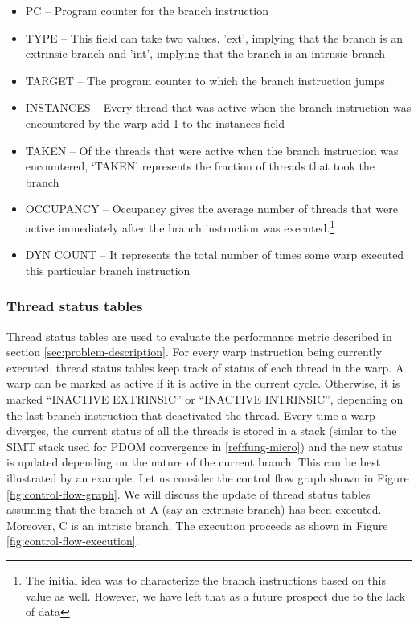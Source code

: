 \begin{itemize}
	\item PC -- Program counter for the branch instruction
	\item TYPE -- This field can take two values. 'ext', implying that the branch is an extrinsic branch and 'int', implying that the branch is an intrnsic branch 
	\item TARGET -- The program counter to which the branch instruction jumps
	\item INSTANCES -- Every thread that was active when the branch instruction was encountered by the warp add 1 to the instances field
	\item TAKEN -- Of the threads that were active when the branch instruction was encountered, `TAKEN' represents the fraction of threads that took the branch
	\item OCCUPANCY -- Occupancy gives the average number of threads that were active immediately after the branch instruction was executed.\footnote{The initial idea was to characterize the branch instructions based on this value as well. However, we have left that as a future prospect due to the lack of data}
	\item DYN COUNT -- It represents the total number of times some warp executed this particular branch instruction
\end{itemize}

	\subsubsection*{Thread status tables}
	Thread status tables are used to evaluate the performance metric described in section \ref{sec:problem-description}. For every warp instruction being currently executed, thread status tables keep track of status of each thread in the warp. A warp can be marked as active if it is active in the current cycle. Otherwise, it is marked ``INACTIVE EXTRINSIC'' or ``INACTIVE INTRINSIC'', depending on the last branch instruction that deactivated the thread. Every time a warp diverges, the current status of all the threads is stored in a stack (simlar to the SIMT stack used for PDOM convergence in \ref{ref:fung-micro}) and the new status is updated depending on the nature of the current branch. This can be best illustrated by an example. Let us consider the control flow graph shown in Figure \ref{fig:control-flow-graph}. We will discuss the update of thread status tables assuming that the branch at A (say an extrinsic branch) has been executed. Moreover, C is an intrisic branch. The execution proceeds as shown in Figure \ref{fig:control-flow-execution}.


